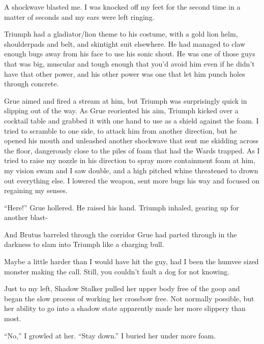 A shockwave blasted me.  I was knocked off my feet for the second time in a matter of seconds and my ears were left ringing.



Triumph had a gladiator/lion theme to his costume, with a gold lion helm, shoulderpads and belt, and skintight suit elsewhere.  He had managed to claw enough bugs away from his face to use his sonic shout.  He was one of those guys that was big, muscular and tough enough that you'd avoid him even if he didn't have that other power, and his other power was one that let him punch holes through concrete.



Grue aimed and fired a stream at him, but Triumph was surprisingly quick in slipping out of the way.  As Grue reoriented his aim, Triumph kicked over a cocktail table and grabbed it with one hand to use as a shield against the foam.  I tried to scramble to one side, to attack him from another direction, but he opened his mouth and unleashed another shockwave that sent me skidding across the floor, dangerously close to the piles of foam that had the Wards trapped.  As I tried to raise my nozzle in his direction to spray more containment foam at him, my vision swam and I saw double, and a high pitched whine threatened to drown out everything else.  I lowered the weapon, sent more bugs his way and focused on regaining my senses.



``Here!'' Grue hollered.  He raised his hand.  Triumph inhaled, gearing up for another blast-



And Brutus barreled through the corridor Grue had parted through in the darkness to slam into Triumph like a charging bull.



Maybe a little harder than I would have hit the guy, had I been the humvee sized monster making the call.  Still, you couldn't fault a dog for not knowing.



Just to my left, Shadow Stalker pulled her upper body free of the goop and began the slow process of working her crossbow free.  Not normally possible, but her ability to go into a shadow state apparently made her more slippery than most.



``No,'' I growled at her. ``Stay down.''  I buried her under more foam.



